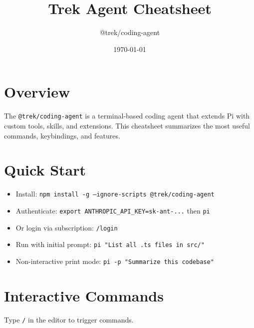\documentclass[12pt]{article}
\title{\textbf{Trek Agent Cheatsheet}}
\author{@trek/coding-agent}
\date{\today}
\begin{document}
\maketitle

\section*{Overview}

The \texttt{@trek/coding-agent} is a terminal-based coding agent that extends Pi with custom tools, skills, and extensions. This cheatsheet summarizes the most useful commands, keybindings, and features.

\section{Quick Start}

\begin{itemize}
    \item Install: \texttt{npm install -g --ignore-scripts @trek/coding-agent}
    \item Authenticate: \texttt{export ANTHROPIC\_API\_KEY=sk-ant-...} then \texttt{pi}
    \item Or login via subscription: \texttt{/login}
    \item Run with initial prompt: \texttt{pi "List all .ts files in src/"}
    \item Non-interactive print mode: \texttt{pi -p "Summarize this codebase"}
\end{itemize}

\section{Interactive Commands}

Type \texttt{/} in the editor to trigger commands.
\end{document}
